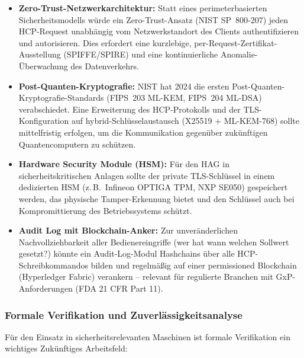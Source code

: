 ﻿\documentclass[12pt,a4paper]{article}
\begin{document}
\begin{itemize}[leftmargin=2em]
  \item \textbf{Zero-Trust-Netzwerkarchitektur:} Statt eines perimeterbasierten
    Sicherheitsmodells würde ein Zero-Trust-Ansatz (NIST SP~800-207) jeden
    HCP-Request unabhängig vom Netzwerkstandort des Clients authentifizieren
    und autorisieren. Dies erfordert eine kurzlebige, per-Request-Zertifikat-
    Ausstellung (SPIFFE/SPIRE) und eine kontinuierliche Anomalie-Überwachung
    des Datenverkehrs.
  \item \textbf{Post-Quanten-Kryptografie:} NIST hat 2024 die ersten
    Post-Quanten-Kryptografie-Standards (FIPS~203 ML-KEM, FIPS~204 ML-DSA)
    verabschiedet. Eine Erweiterung des HCP-Protokolls und der
    TLS-Konfiguration auf hybrid-Schlüsselaustausch (X25519 + ML-KEM-768)
    sollte mittelfristig erfolgen, um die Kommunikation gegenüber zukünftigen
    Quantencomputern zu schützen.
  \item \textbf{Hardware Security Module (HSM):} Für den HAG in
    sicherheitskritischen Anlagen sollte der private TLS-Schlüssel in einem
    dedizierten HSM (z.\,B.\ Infineon OPTIGA TPM, NXP SE050) gespeichert
    werden, das physische Tamper-Erkennung bietet und den Schlüssel auch
    bei Kompromittierung des Betriebssystems schützt.
  \item \textbf{Audit Log mit Blockchain-Anker:} Zur unveränderlichen
    Nachvollziehbarkeit aller Bedienereingriffe (wer hat wann welchen
    Sollwert gesetzt?) könnte ein Audit-Log-Modul Hashchains über
    alle HCP-Schreibkommandos bilden und regelmäßig auf einer permissioned
    Blockchain (Hyperledger Fabric) verankern -- relevant für
    regulierte Branchen mit GxP-Anforderungen (FDA 21 CFR Part 11).
\end{itemize}

\subsubsection*{Formale Verifikation und Zuverlässigkeitsanalyse}

Für den Einsatz in sicherheitsrelevanten Maschinen ist formale Verifikation
ein wichtiges Zukünftiges Arbeitsfeld:
\end{document}
